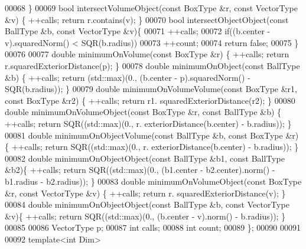 \begin{DoxyCode}
00068   \}
00069   \textcolor{keywordtype}{bool} intersectVolumeObject(\textcolor{keyword}{const} BoxType &r, \textcolor{keyword}{const} VectorType &v) \{ ++calls; \textcolor{keywordflow}{return} r.contains(v); \}
00070   \textcolor{keywordtype}{bool} intersectObjectObject(\textcolor{keyword}{const} BallType &b, \textcolor{keyword}{const} VectorType &v)\{
00071     ++calls;
00072     \textcolor{keywordflow}{if}((b.center - v).squaredNorm() < SQR(b.radius))
00073       ++count;
00074     \textcolor{keywordflow}{return} \textcolor{keyword}{false};
00075   \}
00076 
00077   \textcolor{keywordtype}{double} minimumOnVolume(\textcolor{keyword}{const} BoxType &r) \{ ++calls; \textcolor{keywordflow}{return} r.squaredExteriorDistance(p); \}
00078   \textcolor{keywordtype}{double} minimumOnObject(\textcolor{keyword}{const} BallType &b) \{ ++calls; \textcolor{keywordflow}{return} (std::max)(0., (b.center - p).squaredNorm() -
       SQR(b.radius)); \}
00079   \textcolor{keywordtype}{double} minimumOnVolumeVolume(\textcolor{keyword}{const} BoxType &r1, \textcolor{keyword}{const} BoxType &r2) \{ ++calls; \textcolor{keywordflow}{return} r1.
      squaredExteriorDistance(r2); \}
00080   \textcolor{keywordtype}{double} minimumOnVolumeObject(\textcolor{keyword}{const} BoxType &r, \textcolor{keyword}{const} BallType &b) \{ ++calls; \textcolor{keywordflow}{return} SQR((std::max)(0., r.
      exteriorDistance(b.center) - b.radius)); \}
00081   \textcolor{keywordtype}{double} minimumOnObjectVolume(\textcolor{keyword}{const} BallType &b, \textcolor{keyword}{const} BoxType &r) \{ ++calls; \textcolor{keywordflow}{return} SQR((std::max)(0., r.
      exteriorDistance(b.center) - b.radius)); \}
00082   \textcolor{keywordtype}{double} minimumOnObjectObject(\textcolor{keyword}{const} BallType &b1, \textcolor{keyword}{const} BallType &b2)\{ ++calls; \textcolor{keywordflow}{return} SQR((std::max)(0., 
      (b1.center - b2.center).norm() - b1.radius - b2.radius)); \}
00083   \textcolor{keywordtype}{double} minimumOnVolumeObject(\textcolor{keyword}{const} BoxType &r, \textcolor{keyword}{const} VectorType &v) \{ ++calls; \textcolor{keywordflow}{return} r.
      squaredExteriorDistance(v); \}
00084   \textcolor{keywordtype}{double} minimumOnObjectObject(\textcolor{keyword}{const} BallType &b, \textcolor{keyword}{const} VectorType &v)\{ ++calls; \textcolor{keywordflow}{return} SQR((std::max)(0., 
      (b.center - v).norm() - b.radius)); \}
00085 
00086   VectorType p;
00087   \textcolor{keywordtype}{int} calls;
00088   \textcolor{keywordtype}{int} count;
00089 \};
00090 
00091 
00092 \textcolor{keyword}{template}<\textcolor{keywordtype}{int} Dim>

\end{DoxyCode}
